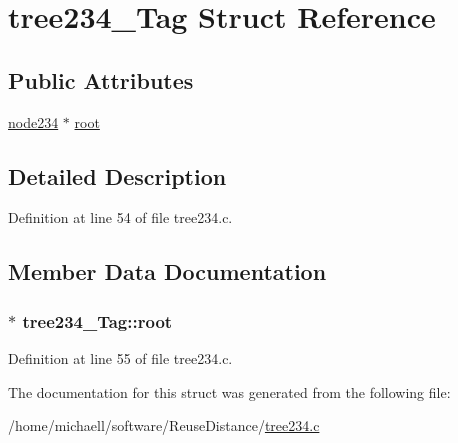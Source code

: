 \hypertarget{structtree234___tag}{
\section{tree234\_\-Tag Struct Reference}
\label{structtree234___tag}
}
\subsection*{Public Attributes}
\begin{DoxyCompactItemize}
\item 
\hyperlink{structnode234___tag}{node234} $\ast$ \hyperlink{structtree234___tag_a87972e40a769f91133666daede8341de}{root}
\end{DoxyCompactItemize}


\subsection{Detailed Description}


Definition at line 54 of file tree234.c.



\subsection{Member Data Documentation}
\hypertarget{structtree234___tag_a87972e40a769f91133666daede8341de}{
\subsubsection[{root}]{$\ast$ {\bf tree234\_\-Tag::root}}}
\label{structtree234___tag_a87972e40a769f91133666daede8341de}


Definition at line 55 of file tree234.c.



The documentation for this struct was generated from the following file:\begin{DoxyCompactItemize}
\item 
/home/michaell/software/ReuseDistance/\hyperlink{tree234_8c}{tree234.c}\end{DoxyCompactItemize}
